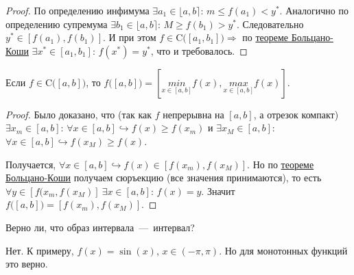 \begin{proof}
    По определению инфимума $\exists a_{1} \in \lfloor a, b\rceil$: $m \leq f (a_{1}) < y^{*}$. Аналогично по определению супремума $\exists b_{1} \in \lfloor a, b\rceil$: $M \geq f (b_{1}) > y^{*}.$ Следовательно $y^{*} \in [f (a_{1}), f (b_{1})]$. И при этом $f \in \text{C} \big( [a_{1}, b_{1} ]\big) \Rightarrow$ по \hyperlink{thm5.4}{теореме Больцано-Коши} $\exists x^{*} \in [a_{1}, b_{1}]$: $f (x^{*}) = y^{*}$, что и требовалось.
\end{proof}
\begin{corollary}
    Если $f \in \text{C} \big([a, b]\big)$, то $f \big( [a, b] \big) = [\underset{x \in [a, b]}{min} f (x), \underset{x \in [a, b]}{max} f (x)].$
\end{corollary}
\begin{proof}
    Было доказано, что (так как $f$ непрерывна на $[a, b]$, а отрезок компакт) $\exists x_{m} \in [a, b]$: $\forall x \in [a, b] \hookrightarrow f (x) \geq f (x_{m})$ и $\exists x_{M} \in [a, b]$: $\forall x \in [a, b] \hookrightarrow f (x_{M}) \geq f (x)$.

    Получается, $\forall x \in [a, b] \hookrightarrow f (x) \in [f (x_{m}), f (x_{M})]$. Но по \hyperlink{thm5.4}{теореме Больцано-Коши} получаем сюръекцию (все значения принимаются), то есть $\forall y \in [f (x_{m}, f (x_{M})] \  \exists x \in [a, b]$: $f (x) = y$. Значит $f \big( [a, b] \big) = [f (x_{m}), f (x_{M})]$.
\end{proof}
\begin{problem}
    Верно ли, что образ интервала~---~интервал?
\end{problem}
\begin{solution}
    Нет. К примеру, $f (x) = \sin (x)$, $x \in (-\pi, \pi)$. Но для монотонных функций это верно.
\end{solution}
